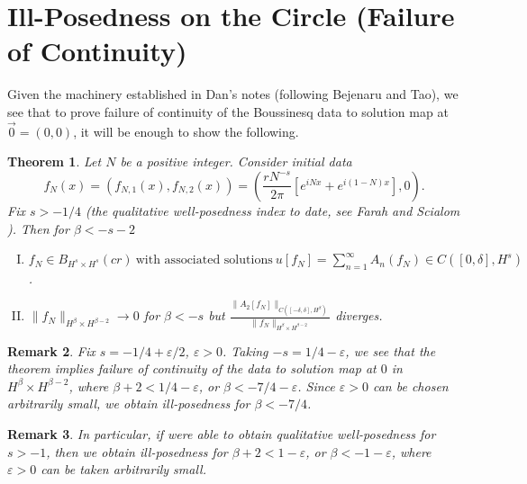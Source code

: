 \documentclass[12pt,reqno]{amsart}
\numberwithin{equation}{section}  %
\newcommand{\ee}{\varepsilon}
\newtheorem{theorem}{Theorem}[section]
\newtheorem{remark}[theorem]{Remark}
\begin{document}
\section{Ill-Posedness on the Circle (Failure of Continuity)} 
\label{sec:pf-ill-pos}
Given the machinery established in Dan's notes (following Bejenaru and Tao), we see that to prove failure of continuity of the Boussinesq data to solution map at $\vec{0} =
(0, 0)$, it will be enough to show the
following.
%
%
%
%
%
%
%
%
%
%
%
\begin{theorem}
  Let $N$ be a positive integer. Consider initial data $$f_{N}(x) =
  (f_{N,1}(x), f_{N,2}(x)) = \left ( \frac{r N^{-s}}{2 \pi}\left[ e^{iNx} + e^{i(1-N)x} \right], 0
  \right ).$$  Fix $ s > -1/4$ (the qualitative well-posedness index to date, see Farah and Scialom \cite{Farah:2010ys}). Then for $\beta < -s -2$
    \begin{enumerate}[(I)]
      \item{$ f_{N} \in B_{H^{s} \times H^{s}}(cr) \ \text{with associated
    solutions}
    \ u[f_{N}] = \sum_{n=1}^{\infty} A_{n}(f_{N}) \in C([0, \delta],
    H^{s})$}.
    \\
  \item
    $\|f_{N}\|_{H^{\beta} \times H^{\beta-2}} \to 0$ for $\beta < -s$ but 
    $ \displaystyle \frac{\|A_{2}[f_{N}]\|_{C( [-\delta, \delta], H^{\beta})}}{\| f_{N} \|_{H^{\beta} \times H^{\beta -2}}}$ diverges.
\end{enumerate}
\label{thm:ill-pos}
\end{theorem}
%
%
\begin{framed}
  \begin{remark}
    Fix $s = -1/4 + \ee/2$, $\ee > 0$. Taking $-s = 1/4 - \ee$, we see that the theorem implies failure of continuity of the data to solution map at $0$ in $H^{\beta} \times H^{\beta -2}$, where $\beta + 2 < 1/4 - \ee$, or $\beta < -7/4 - \ee$. Since $\ee > 0$ can be chosen arbitrarily small, we obtain ill-posedness for $\beta < -7/4$. 
  \end{remark}
\end{framed}
%
%
\begin{framed}
  \begin{remark}
    In particular, if were able to obtain qualitative well-posedness for $s >-1$, then we obtain ill-posedness for $\beta + 2 < 1 - \ee$, or $ \beta < -1 - \ee$, where $\ee > 0$ can be taken arbitrarily small. 
  \end{remark}
\end{framed}
\end{document}
